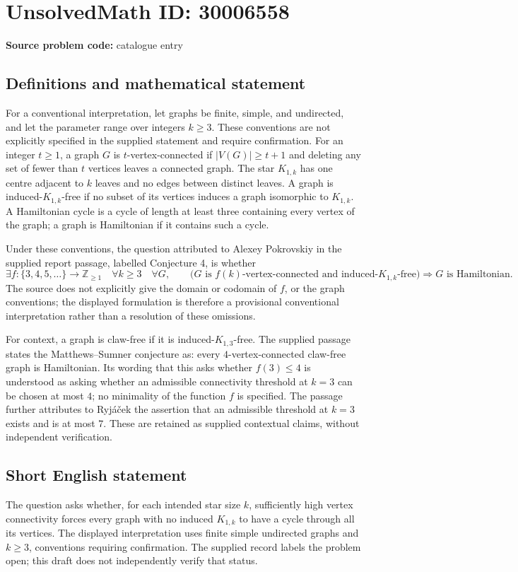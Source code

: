 \documentclass[11pt]{article}
\begin{document}
\section*{UnsolvedMath ID: 30006558}
\textbf{Source problem code:} catalogue entry
\subsection{Definitions and mathematical statement}
For a conventional interpretation, let graphs be finite, simple, and undirected, and let the parameter range over integers \(k\geq 3\). These conventions are not explicitly specified in the supplied statement and require confirmation. For an integer \(t\geq 1\), a graph \(G\) is \(t\)-vertex-connected if \(|V(G)|\geq t+1\) and deleting any set of fewer than \(t\) vertices leaves a connected graph. The star \(K_{1,k}\) has one centre adjacent to \(k\) leaves and no edges between distinct leaves. A graph is induced-\(K_{1,k}\)-free if no subset of its vertices induces a graph isomorphic to \(K_{1,k}\). A Hamiltonian cycle is a cycle of length at least three containing every vertex of the graph; a graph is Hamiltonian if it contains such a cycle.

Under these conventions, the question attributed to Alexey Pokrovskiy in the supplied report passage, labelled Conjecture 4, is whether
\[
\exists f:\{3,4,5,\ldots\}\longrightarrow\mathbb Z_{\geq 1}\quad
\forall k\geq 3\quad\forall G,\qquad
\bigl(G\text{ is }f(k)\text{-vertex-connected and induced-}K_{1,k}\text{-free}\bigr)
\Longrightarrow G\text{ is Hamiltonian}.
\]
The source does not explicitly give the domain or codomain of \(f\), or the graph conventions; the displayed formulation is therefore a provisional conventional interpretation rather than a resolution of these omissions.

For context, a graph is claw-free if it is induced-\(K_{1,3}\)-free. The supplied passage states the Matthews--Sumner conjecture as: every \(4\)-vertex-connected claw-free graph is Hamiltonian. Its wording that this asks whether \(f(3)\leq 4\) is understood as asking whether an admissible connectivity threshold at \(k=3\) can be chosen at most \(4\); no minimality of the function \(f\) is specified. The passage further attributes to Ryj\'{a}\v{c}ek the assertion that an admissible threshold at \(k=3\) exists and is at most \(7\). These are retained as supplied contextual claims, without independent verification.
\subsection{Short English statement}
The question asks whether, for each intended star size \(k\), sufficiently high vertex connectivity forces every graph with no induced \(K_{1,k}\) to have a cycle through all its vertices. The displayed interpretation uses finite simple undirected graphs and \(k\geq 3\), conventions requiring confirmation. The supplied record labels the problem open; this draft does not independently verify that status.
\end{document}
